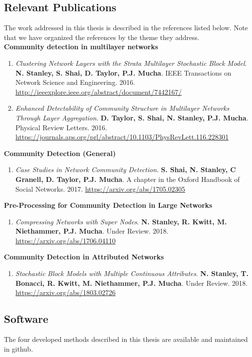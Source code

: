 \subsection{Relevant Publications}
The work addressed in this thesis is described in the references listed below. Note that we have organized the references by the theme they address. \\

{\bf Community detection in multilayer networks}
\begin{enumerate}
\item \emph{Clustering Network Layers with the Strata Multilayer Stochastic Block Model}. {\bf N. Stanley, S. Shai, D. Taylor, P.J. Mucha}. IEEE Transactions on Network Science and Engineering. 2016. \url{http://ieeexplore.ieee.org/abstract/document/7442167/}
\item \emph{Enhanced Detectability of Community Structure in Multilayer Networks Through Layer Aggregation}. {\bf D. Taylor, S. Shai, N. Stanley, P.J. Mucha}. Physical Review Letters. 2016. \url{https://journals.aps.org/prl/abstract/10.1103/PhysRevLett.116.228301}
\end{enumerate}

{\bf Community Detection (General)}
\begin{enumerate}
\item \emph{Case Studies in Network Community Detection.} {\bf S. Shai, N. Stanley, C Granell, D. Taylor, P.J. Mucha}. A chapter in the Oxford Handbook of Social Networks. 2017. \url{https://arxiv.org/abs/1705.02305}
\end{enumerate}

{\bf Pre-Processing for Community Detection in Large Networks}
\begin{enumerate}
\item \emph{Compressing Networks with Super Nodes}. {\bf N. Stanley, R. Kwitt, M. Niethammer, P.J. Mucha}. Under Review. 2018. \url{https://arxiv.org/abs/1706.04110}
\end{enumerate}

 {\bf Community Detection in Attributed Networks}
 \begin{enumerate}
 \item \emph{Stochastic Block Models with Multiple Continuous Attributes}. {\bf N. Stanley, T. Bonacci, R. Kwitt, M. Niethammer, P.J. Mucha}. Under Review. 2018. \url{https://arxiv.org/abs/1803.02726} 
 \end{enumerate}
 
 \subsection{Software}
 The four developed methods described in this thesis are available and maintained in github. 
 
